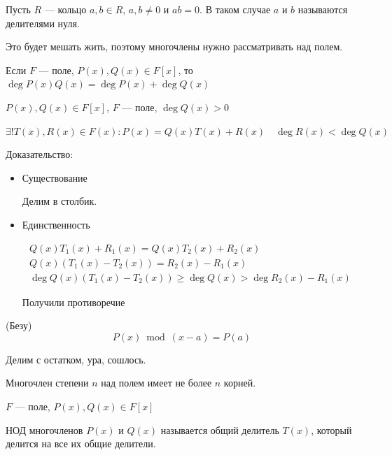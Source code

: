 \begin{defn}{}{}
    Пусть \( R \) --- кольцо \( a, b \in R \), \( a, b \neq 0 \) и \( ab = 0 \).
    В таком случае \( a \) и \( b \) называются делителями нуля.
\end{defn}

Это будет мешать жить, поэтому многочлены нужно рассматривать над полем.

Если \( F \) --- поле, \( P(x), Q(x) \in F[x] \), то \( \deg P(x) Q(x) = \deg P(x) + \deg Q(x) \)

\begin{thrm}{}{}
    \( P(x), Q(x) \in F[x] \), \( F \) --- поле, \( \deg Q(x) > 0 \)

    \( \exists! T(x), R(x) \in F(x) : P(x) = Q(x) T(x) + R(x) \quad \deg R(x) < \deg Q(x) \)
\end{thrm}

Доказательство:
\begin{itemize}
    \item
        Существование

        Делим в столбик.
    \item
        Единственность

        \begin{gather*}
            Q(x) T_1 (x) + R_1 (x) = Q(x) T_2 (x) + R_2 (x)
            \\
            Q(x) (T_1 (x) - T_2 (x)) = R_2 (x) - R_1 (x)
            \\
            \deg Q(x) (T_1 (x) - T_2 (x)) \geq \deg Q(x) > \deg R_2 (x) - R_1 (x)
        \end{gather*}

        Получили противоречие
\end{itemize}

\begin{thrm}{(Безу)}{}
    \[
        P(x) \bmod (x - a) = P(a)
    \]
\end{thrm}

Делим с остатком, ура, сошлось.

\begin{coroll}{}{}
    Многочлен степени \( n \) над полем имеет не более \( n \) корней.
\end{coroll}

\begin{defn}{}{}
    \( F \) --- поле, \( P(x), Q(x) \in F[x] \)

    НОД многочленов \( P(x) \) и \( Q(x) \) называется общий делитель \( T(x) \),
    который делится на все их общие делители.
\end{defn}

